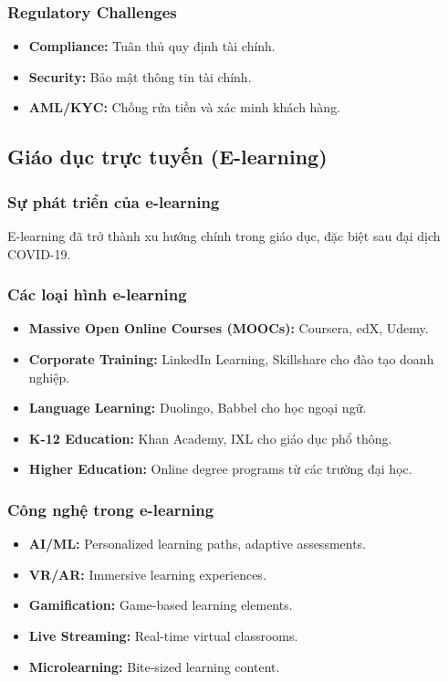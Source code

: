 \documentclass[a4paper,12pt]{report}
\begin{document}
\subsubsection{Regulatory Challenges}
\begin{itemize}
    \item \textbf{Compliance:} Tuân thủ quy định tài chính.
    \item \textbf{Security:} Bảo mật thông tin tài chính.
    \item \textbf{AML/KYC:} Chống rửa tiền và xác minh khách hàng.
\end{itemize}

\subsection{Giáo dục trực tuyến (E-learning)}

\subsubsection{Sự phát triển của e-learning}
E-learning đã trở thành xu hướng chính trong giáo dục, đặc biệt sau đại dịch COVID-19.

\subsubsection{Các loại hình e-learning}
\begin{itemize}
    \item \textbf{Massive Open Online Courses (MOOCs):} Coursera, edX, Udemy.
    \item \textbf{Corporate Training:} LinkedIn Learning, Skillshare cho đào tạo doanh nghiệp.
    \item \textbf{Language Learning:} Duolingo, Babbel cho học ngoại ngữ.
    \item \textbf{K-12 Education:} Khan Academy, IXL cho giáo dục phổ thông.
    \item \textbf{Higher Education:} Online degree programs từ các trường đại học.
\end{itemize}

\subsubsection{Công nghệ trong e-learning}
\begin{itemize}
    \item \textbf{AI/ML:} Personalized learning paths, adaptive assessments.
    \item \textbf{VR/AR:} Immersive learning experiences.
    \item \textbf{Gamification:} Game-based learning elements.
    \item \textbf{Live Streaming:} Real-time virtual classrooms.
    \item \textbf{Microlearning:} Bite-sized learning content.
\end{itemize}
\end{document}
